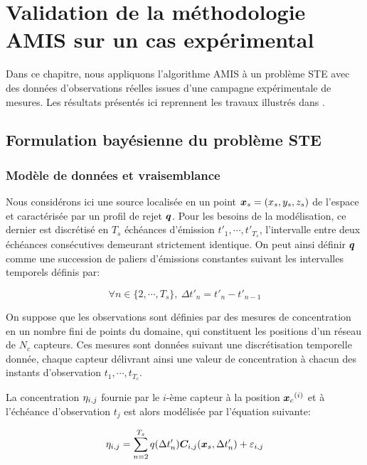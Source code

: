 \chapter{Validation de la méthodologie AMIS sur un cas expérimental}

Dans ce chapitre, nous appliquons l'algorithme AMIS à un problème STE avec des données d'observations réelles issues d'une campagne expérimentale de mesures. Les résultats présentés ici reprennent les travaux illustrés dans \cite{Rajaona2015}.

\section{Formulation bayésienne du problème STE}

\subsection{Modèle de données et vraisemblance}

Nous considérons ici une source localisée en un point ${\bm{x}_s} = (x_s, y_s, z_s)$ de l'espace et caractérisée par un profil de rejet ${\bm{q}}$. Pour les besoins de la modélisation, ce dernier est discrétisé en $T_s$ échéances d'émission $t'_1, \cdots, t'_{T_s}$, l'intervalle entre deux échéances consécutives demeurant strictement identique. On peut ainsi définir ${\bm{q}}$ comme une succession de paliers d'émissions constantes suivant les intervalles temporels définis par:

\begin{equation}
\forall n \in \{2, \cdots, T_s\}, ~\Delta t'_n = t'_{n} - t'_{n-1}
\label{eq_def_delta_t}
\end{equation}


On suppose que les observations sont définies par des mesures de concentration en un nombre fini de points du domaine, qui constituent les positions d'un réseau de $N_c$ capteurs. Ces mesures sont données suivant une discrétisation temporelle donnée, chaque capteur délivrant ainsi une valeur de concentration à chacun des instants d'observation $t_1, \cdots, t_{T_c}$.




 La concentration ${\eta}_{i,j}$ fournie par le $i$-ème capteur à la position ${\bm{x}_c}^{(i)}$ et à l'échéance d'observation $t_j$ est alors modélisée par l'équation suivante:
 
\begin{equation}
{\eta}_{i,j} = \sum\limits_{n=2}^{T_s}q(\Delta t'_n){\bm{C}}_{i,j}({\bm{x}_s}, \Delta t'_n) + \varepsilon_{i,j}
\label{eq_AE_2}
\end{equation}

